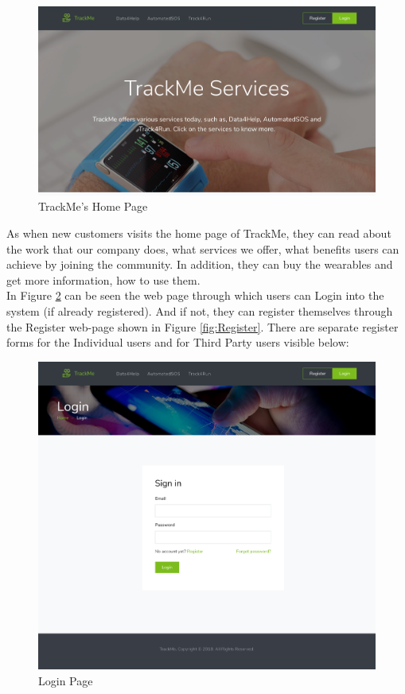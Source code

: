 \documentclass[a4paper, hidelinks, 12pt]{report}
\begin{document}
	\begin{figure}[H]
		\centering
		\includegraphics[width=1\textwidth]{Diagrams/ui/d4h_home_page.png}
		\caption[UI: TrackMe's Home Page]{TrackMe's Home Page}
		\label{fig:Home_Page}
	\end{figure}
	
	As when new customers visits the home page of TrackMe, they can read about the work that our company does, what services we offer, what benefits users can achieve by joining the community. In addition, they can buy the wearables and get more information, how to use them.\\

	In Figure \ref{fig:Login} can be seen the web page through which users can Login into the system (if already registered). And if not, they can register themselves through the Register web-page shown in Figure \ref{fig:Register}. There are separate register forms for the Individual users and for Third Party users visible below:
	
	\begin{figure}[H]
		\centering
		\includegraphics[width=1\textwidth]{Diagrams/ui/d4h_login.png}
		\caption[UI: Login Page]{Login Page}
		\label{fig:Login}
	\end{figure}
	
\end{document}
